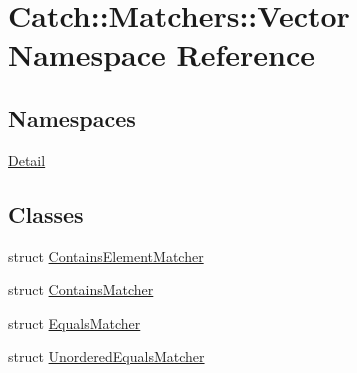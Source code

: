 \hypertarget{namespace_catch_1_1_matchers_1_1_vector}{\section{Catch\-:\-:Matchers\-:\-:Vector Namespace Reference}
\label{namespace_catch_1_1_matchers_1_1_vector}
}
\subsection*{Namespaces}
\begin{DoxyCompactItemize}
\item 
\hyperlink{namespace_catch_1_1_matchers_1_1_vector_1_1_detail}{Detail}
\end{DoxyCompactItemize}
\subsection*{Classes}
\begin{DoxyCompactItemize}
\item 
struct \hyperlink{struct_catch_1_1_matchers_1_1_vector_1_1_contains_element_matcher}{Contains\-Element\-Matcher}
\item 
struct \hyperlink{struct_catch_1_1_matchers_1_1_vector_1_1_contains_matcher}{Contains\-Matcher}
\item 
struct \hyperlink{struct_catch_1_1_matchers_1_1_vector_1_1_equals_matcher}{Equals\-Matcher}
\item 
struct \hyperlink{struct_catch_1_1_matchers_1_1_vector_1_1_unordered_equals_matcher}{Unordered\-Equals\-Matcher}
\end{DoxyCompactItemize}

